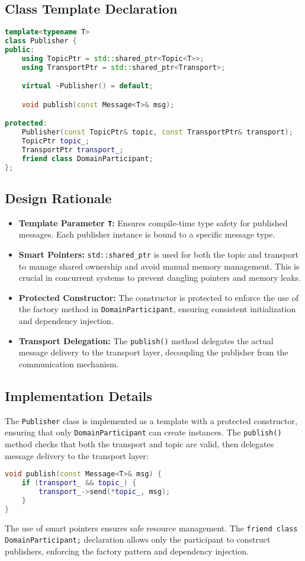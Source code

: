 \documentclass[12pt]{report}
\begin{document}
\subsection{Class Template Declaration}
\begin{lstlisting}[language=C++]
template<typename T>
class Publisher {
public:
    using TopicPtr = std::shared_ptr<Topic<T>>;
    using TransportPtr = std::shared_ptr<Transport>;

    virtual ~Publisher() = default;

    void publish(const Message<T>& msg);

protected:
    Publisher(const TopicPtr& topic, const TransportPtr& transport);
    TopicPtr topic_;
    TransportPtr transport_;
    friend class DomainParticipant;
};
\end{lstlisting}

\subsection{Design Rationale}
\begin{itemize}
    \item \textbf{Template Parameter \texttt{T}:} Ensures compile-time type safety for published messages. Each publisher instance is bound to a specific message type.
    \item \textbf{Smart Pointers:} \texttt{std::shared\_ptr} is used for both the topic and transport to manage shared ownership and avoid manual memory management. This is crucial in concurrent systems to prevent dangling pointers and memory leaks.
    \item \textbf{Protected Constructor:} The constructor is protected to enforce the use of the factory method in \texttt{DomainParticipant}, ensuring consistent initialization and dependency injection.
    \item \textbf{Transport Delegation:} The \texttt{publish()} method delegates the actual message delivery to the transport layer, decoupling the publisher from the communication mechanism.
\end{itemize}

\subsection{Implementation Details}
The \texttt{Publisher} class is implemented as a template with a protected constructor, ensuring that only \texttt{DomainParticipant} can create instances. The \texttt{publish()} method checks that both the transport and topic are valid, then delegates message delivery to the transport layer:
\begin{lstlisting}[language=C++]
void publish(const Message<T>& msg) {
    if (transport_ && topic_) {
        transport_->send(*topic_, msg);
    }
}
\end{lstlisting}
The use of smart pointers ensures safe resource management. The \texttt{friend class DomainParticipant;} declaration allows only the participant to construct publishers, enforcing the factory pattern and dependency injection.
\end{document}

